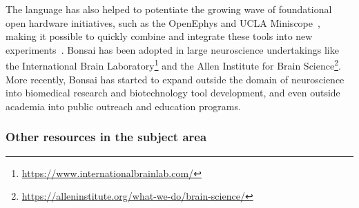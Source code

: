The language has also helped to potentiate the growing wave of foundational
open hardware initiatives, such as the OpenEphys \citep{siegleEtAl17} and UCLA
Miniscope~\citep{caiEtAl16}, making it possible to quickly combine and
integrate these tools into new experiments~\citep{buccinoEtAl18}.
%
Bonsai has been adopted in large neuroscience undertakings like the
International Brain
Laboratory\footnote{\href{https://www.internationalbrainlab.com/}{https://www.internationalbrainlab.com/}}
and the Allen Institute for Brain
Science\footnote{\href{https://alleninstitute.org/what-we-do/brain-science/}{https://alleninstitute.org/what-we-do/brain-science/}}.
%
More recently, Bonsai has started to expand outside the domain of neuroscience
into biomedical research and biotechnology tool development, and even outside
academia into public outreach and education programs.

\subsubsection*{Other resources in the subject area}

